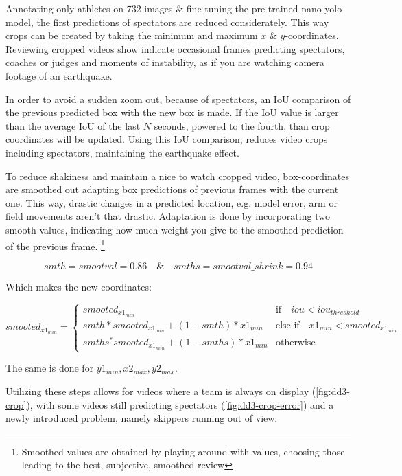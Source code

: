 Annotating only athletes on 732 images \& fine-tuning the pre-trained nano yolo model, the first predictions of spectators are reduced considerately.
This way crops can be created by taking the minimum and maximum \(x\) \& \(y\)-coordinates. Reviewing cropped videos show indicate occasional frames predicting spectators, coaches or judges and moments of instability, as if you are watching camera footage of an earthquake.

In order to avoid a sudden zoom out, because of spectators, an IoU comparison of the previous predicted box with the new box is made. If the IoU value is larger than the average IoU of the last \(N\) seconds, powered to the fourth, than crop coordinates will be updated. Using this IoU comparison, reduces video crops including spectators, maintaining the earthquake effect.


To reduce shakiness and maintain a nice to watch cropped video, box-coordinates are smoothed out adapting box predictions of previous frames with the current one. This way, drastic changes in a predicted location, e.g. model error, arm or field movements aren't that drastic. Adaptation is done by incorporating two smooth values, indicating how much weight you give to the smoothed prediction of the previous frame. \footnote{Smoothed values are obtained by playing around with values, choosing those leading to the best, subjective, smoothed review}

$$ smth = smootval = 0.86  \quad \& \quad smths = smootval\_shrink = 0.94 $$

Which makes the new coordinates:

\begin{math}
   smooted_{x1_{min}} =
   \begin{cases}
       smooted_{x1_{min}} & \text{if} \quad iou < iou_{threshold} \\
       smth * smooted_{x1_{min}} + (1-smth) * x1_{min} & \text{else if} \quad x1_{min} < smooted_{x1_{min}} \\
       smths^ * smooted_{x1_{min}} + (1-smths) * x1_{min} & \text{otherwise}
   \end{cases}
\end{math}

The same is done for \( y1_{min}, x2_{max}, y2_{max} \).

Utilizing these steps allows for videos where a team is always on display (\ref{fig:dd3-crop}), with some videos still predicting spectators (\ref{fig:dd3-crop-error}) and a newly introduced problem, namely skippers running out of view.

